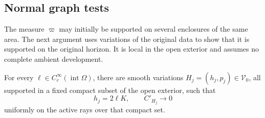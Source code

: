\subsection{Normal graph tests}

The measure $\varpi$ may initially be supported on several enclosures of
the same area. The next argument uses variations of the original data to
show that it is supported on the original horizon. It is local in the open
exterior and assumes no complete ambient development.

\begin{lemma}
\label{rig4:var:normal-tests}
For every $\ell\in C^\infty_c(\operatorname{int}\Omega)$, there are smooth
variations $H_j=(h_j,p_j)\in\mathcal V_0$, all supported in a fixed compact
subset of the open exterior, such that
\[
 h_j=2\ell K,\qquad C'_{H_j}\longrightarrow0
\]
uniformly on the active rays over that compact set.
\end{lemma}

